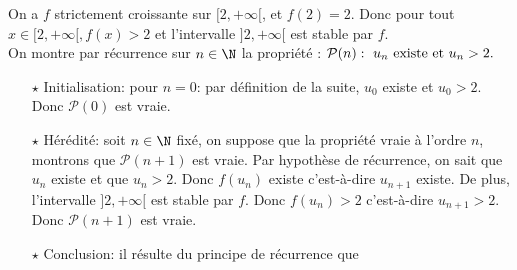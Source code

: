 \documentclass[a4paper, 11pt]{article}
\begin{document}
\begin{correction}
\begin{enumerate}
\begin{enumerate}
On a $f$ strictement croissante sur $[2,+\infty[$, et $f(2) =2$. Donc pour tout $x \in [2,+\infty[, f(x) > 2$ et l'intervalle  $\rbrack 2,+\infty\lbrack$ est stable par $f$.\\
On montre par r\'ecurrence sur $n\in\N$ la propri\'et\'e : $\mathcal{P}(n):\ u_n\ \hbox{existe et}\ u_n>2.$
\begin{itemize}
\item[$\star$] Initialisation: pour $n=0$: par d\'efinition de la suite, $u_0$ existe et $u_0>2$. Donc $\mathcal{P}(0)$ est vraie.
\item[$\star$] H\'er\'edit\'e: soit $n\in\N$ fix\'e, on suppose que la propri\'et\'e vraie \`{a} l'ordre $n$, montrons que $\mathcal{P}(n+1)$ est vraie. Par hypoth\`{e}se de r\'ecurrence, on sait que $u_n$ existe et que $u_n>2$. Donc $f(u_n)$ existe c'est-\`{a}-dire $u_{n+1}$ existe. De plus, l'intervalle $\rbrack 2,+\infty\lbrack$ est stable par $f$. Donc $f(u_n)>2$ c'est-\`{a}-dire $u_{n+1}>2$.
Donc $\mathcal{P}(n+1)$ est vraie.
\item[$\star$] Conclusion: il r\'esulte du principe de r\'ecurrence que


\end{itemize}
\end{enumerate}
\end{enumerate}
\end{correction}
\end{document}
